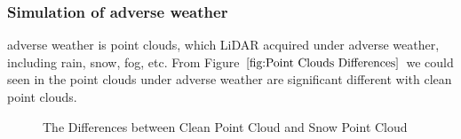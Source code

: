\subsubsection{Simulation of adverse weather}
adverse weather is point clouds, which LiDAR acquired under adverse weather, including rain, snow, fog, etc. From Figure \(\ref{fig:Point Clouds Differences}\) we could seen in the point clouds under adverse weather are significant different with clean point clouds. 
\begin{figure}[!htbp]
    \centering
    \hspace{10pt}
    \caption[Short Description for List of Figures]{The Differences between Clean Point Cloud and Snow Point Cloud}
    \label{fig:Point Clouds Differences}
\end{figure}

